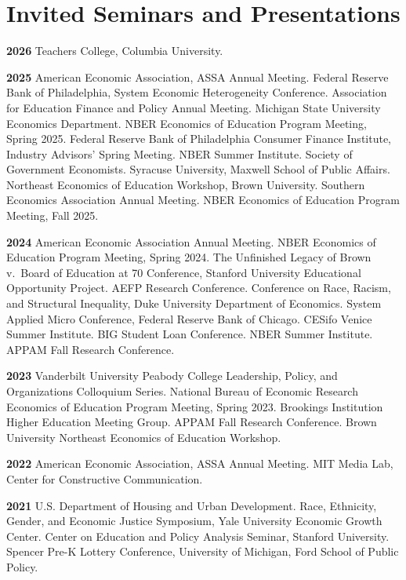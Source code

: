 \documentclass[11pt,letterpaper]{article}
\begin{document}
\section*{Invited Seminars and Presentations}

\textbf{2026} \quad Teachers College, Columbia University.

\medskip

\textbf{2025} \quad American Economic Association, ASSA Annual Meeting. Federal Reserve Bank of Philadelphia, System Economic Heterogeneity Conference. Association for Education Finance and Policy Annual Meeting. Michigan State University Economics Department. NBER Economics of Education Program Meeting, Spring 2025. Federal Reserve Bank of Philadelphia Consumer Finance Institute, Industry Advisors' Spring Meeting. NBER Summer Institute. Society of Government Economists. Syracuse University, Maxwell School of Public Affairs. Northeast Economics of Education Workshop, Brown University. Southern Economics Association Annual Meeting. NBER Economics of Education Program Meeting, Fall 2025.

\medskip

\textbf{2024} \quad American Economic Association Annual Meeting. NBER Economics of Education Program Meeting, Spring 2024. The Unfinished Legacy of Brown v.\ Board of Education at 70 Conference, Stanford University Educational Opportunity Project. AEFP Research Conference. Conference on Race, Racism, and Structural Inequality, Duke University Department of Economics. System Applied Micro Conference, Federal Reserve Bank of Chicago. CESifo Venice Summer Institute. BIG Student Loan Conference. NBER Summer Institute. APPAM Fall Research Conference.

\medskip

\textbf{2023} \quad Vanderbilt University Peabody College Leadership, Policy, and Organizations Colloquium Series. National Bureau of Economic Research Economics of Education Program Meeting, Spring 2023. Brookings Institution Higher Education Meeting Group. APPAM Fall Research Conference. Brown University Northeast Economics of Education Workshop.

\medskip

\textbf{2022} \quad American Economic Association, ASSA Annual Meeting. MIT Media Lab, Center for Constructive Communication.

\medskip

\textbf{2021} \quad U.S. Department of Housing and Urban Development. Race, Ethnicity, Gender, and Economic Justice Symposium, Yale University Economic Growth Center. Center on Education and Policy Analysis Seminar, Stanford University. Spencer Pre-K Lottery Conference, University of Michigan, Ford School of Public Policy.
\end{document}
